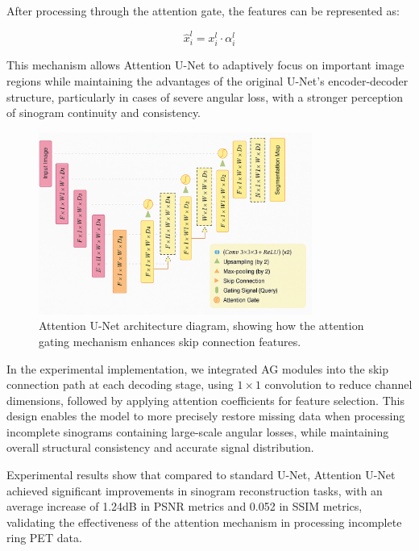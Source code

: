 \documentclass[
reprint,
superscriptaddress,
nofootinbib,
amsmath,amssymb,
aps,
prd,
]{revtex4-2}
\begin{document}
After processing through the attention gate, the features can be represented as:

\begin{equation}
\hat{x}_i^l = x_i^l \cdot \alpha_i^l
\end{equation}

This mechanism allows Attention U-Net to adaptively focus on important image regions while maintaining the advantages of the original U-Net's encoder-decoder structure, particularly in cases of severe angular loss, with a stronger perception of sinogram continuity and consistency.
\begin{figure}[htbp]
    \centering
    \vspace{-.2cm}
    \includegraphics[width=0.8\textwidth]{Images/Unet.png}
    \vspace{-.3cm}
    \caption{Attention U-Net architecture diagram, showing how the attention gating mechanism enhances skip connection features.}
    \label{fig:unet_structure}
\end{figure}
In the experimental implementation, we integrated AG modules into the skip connection path at each decoding stage, using $1\times1$ convolution to reduce channel dimensions, followed by applying attention coefficients for feature selection. This design enables the model to more precisely restore missing data when processing incomplete sinograms containing large-scale angular losses, while maintaining overall structural consistency and accurate signal distribution.

Experimental results show that compared to standard U-Net, Attention U-Net achieved significant improvements in sinogram reconstruction tasks, with an average increase of 1.24dB in PSNR metrics and 0.052 in SSIM metrics, validating the effectiveness of the attention mechanism in processing incomplete ring PET data.
\end{document}

